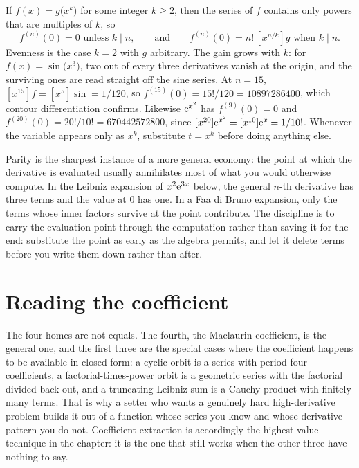 \begin{keynote}[Parity is the case $k=2$ of a sharper statement]
If $f(x)=g\bigl(x^{k}\bigr)$ for some integer $k\geq2$, then the series of $f$ contains only powers that are multiples of $k$, so
\[
f^{(n)}(0)=0 \text{ unless } k\mid n,\qquad\text{and}\qquad f^{(n)}(0)=n!\,[x^{n/k}]g \text{ when } k\mid n .
\]
Evenness is the case $k=2$ with $g$ arbitrary. The gain grows with $k$: for $f(x)=\sin\bigl(x^{3}\bigr)$, two out of every three derivatives vanish at the origin, and the surviving ones are read straight off the sine series. At $n=15$, $[x^{15}]f=[x^{5}]\sin=1/120$, so $f^{(15)}(0)=15!/120=10897286400$, which contour differentiation confirms. Likewise $\mathrm{e}^{x^{2}}$ has $f^{(9)}(0)=0$ and $f^{(20)}(0)=20!/10!=670442572800$, since $[x^{20}]\mathrm{e}^{x^{2}}=[x^{10}]\mathrm{e}^{x}=1/10!$. Whenever the variable appears only as $x^{k}$, substitute $t=x^{k}$ before doing anything else.
\end{keynote}

\begin{keynote}
Parity is the sharpest instance of a more general economy: the point at which the derivative is evaluated usually annihilates most of what you would otherwise compute. In the Leibniz expansion of $x^{2}\mathrm{e}^{3x}$ below, the general $n$-th derivative has three terms and the value at $0$ has one. In a Faa di Bruno expansion, only the terms whose inner factors survive at the point contribute. The discipline is to carry the evaluation point through the computation rather than saving it for the end: substitute the point as early as the algebra permits, and let it delete terms before you write them down rather than after.
\end{keynote}

\section{Reading the coefficient}

The four homes are not equals. The fourth, the Maclaurin coefficient, is the general one, and the first three are the special cases where the coefficient happens to be available in closed form: a cyclic orbit is a series with period-four coefficients, a factorial-times-power orbit is a geometric series with the factorial divided back out, and a truncating Leibniz sum is a Cauchy product with finitely many terms. That is why a setter who wants a genuinely hard high-derivative problem builds it out of a function whose series you know and whose derivative pattern you do not. Coefficient extraction is accordingly the highest-value technique in the chapter: it is the one that still works when the other three have nothing to say.

